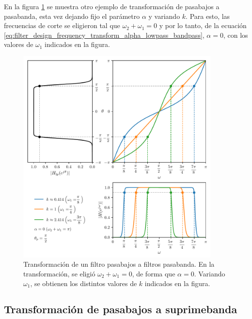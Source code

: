 \documentclass[a4paper]{report}
\begin{document}
En la figura \ref{fig:filter_design_frequency_transformations_low_bandpass_k} se muestra otro ejemplo de transformación de pasabajos a pasabanda, esta vez dejando fijo el parámetro \(\alpha\) y variando \(k\). Para esto, las frecuencias de corte se eligieron tal que \(\omega_2+\omega_1=0\) y por lo tanto, de la ecuación \ref{eq:filter_design_frequency_transform_alpha_lowpass_bandpass}, \(\alpha=0\), con los valores de \(\omega_1\) indicados en la figura. 
\begin{figure}[!htb]
 \begin{center}
 \includegraphics[width=0.91\textwidth]{figuras/filter_design_frequency_transformations_low_bandpass_k.pdf}
 \caption{\label{fig:filter_design_frequency_transformations_low_bandpass_k} Transformación de un filtro pasabajos a filtros pasabanda. En la transformación, se eligió \(\omega_2+\omega_1=0\), de forma que \(\alpha=0\). Variando \(\omega_1\), se obtienen los distintos valores de \(k\) indicados en la figura.}
 \end{center}
\end{figure}

\subsection{Transformación de pasabajos a suprimebanda}
\end{document}
